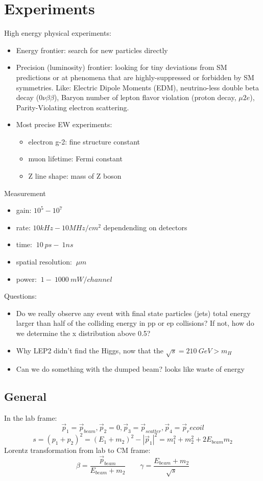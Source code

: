 \chapter{Experiments}
High energy physical experiments:
\begin{itemize}
    \item Energy frontier: search for new particles directly
    \item Precision (luminosity) frontier: looking for tiny deviations from SM
	predictions or at phenomena that are highly-suppressed or forbidden 
	by SM symmetries. Like: Electric Dipole Moments (EDM), neutrino-less
	double beta decay ($0\nu\beta\beta$), Baryon number of lepton flavor
	violation (proton decay, $\mu 2e$), Parity-Violating electron scattering.
    \item Most precise EW experiments:
	\begin{itemize}
	    \item electron g-2: fine structure constant
	    \item muon lifetime: Fermi constant
	    \item Z line shape: mass of Z boson
	\end{itemize}
\end{itemize}

Measurement
\begin{itemize}
    \item gain: $10^5 - 10^7$
    \item rate: $10 kHz - 10 MHz/cm^2$ dependending on detectors
    \item time: $~10\ ps - ~1ns$ 
    \item spatial resolution: $~\mu m$
    \item power: $~1 - ~1000\ mW/channel$
\end{itemize}
Questions:
\begin{itemize}
    \item Do we really observe any event with final state particles (jets) total
	energy larger than half of the colliding energy in pp or ep collisions?
	If not, how do we determine the x distribution above 0.5?
    \item Why LEP2 didn't find the Higgs, now that the $\sqrt{s} = 210 \ GeV > m_H$ 
    \item Can we do something with the dumped beam? looks like waste of energy
\end{itemize}

\section{General}
In the lab frame:
$$ \vec{p}_1 = \vec{p}_{beam}, \vec{p}_2 = 0, \vec{p}_3 = \vec{p}_{scatter}, \vec{p}_4 = \vec{p}_recoil $$
$$ s = (p_1 + p_2)^2 = (E_1 + m_2)^2 - |\vec{p}_1|^2 = m_1^2 + m_2^2 + 2E_{beam}m_2 $$
Lorentz transformation from lab to CM frame:
$$ \beta = \frac{\vec{p}_{beam}}{E_{beam} + m_2} \qquad \gamma = \frac{E_{beam} + m_2}{\sqrt{s}} $$
